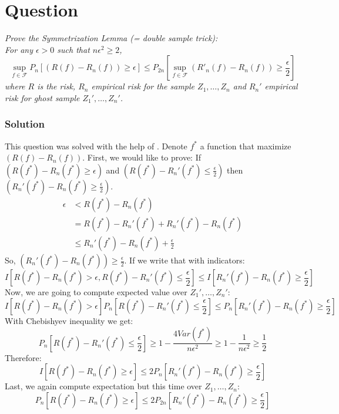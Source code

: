 \documentclass{article}
\newcounter{counterquestion}
\newenvironment{question}[1]
{
\stepcounter{counterquestion}
\section*{Question \thecounterquestion}
\emph{#1} 
} 
{
}
\newenvironment{solution}
{
\subsubsection*{Solution}
} 
{
}
\begin{document}
\begin{question}{Prove the Symmetrization Lemma (= double sample trick): \\
For any $\epsilon > 0$ such that $n\epsilon^2 \geq 2$, 
\[
\sup_{f \in \mathcal{F}} P_n \left[  (R(f) - R_n(f)) \geq \epsilon \right] \leq P_{2n} \left[ \sup_{f \in \mathcal{F}} (R'_n(f) - R_n(f)) \geq \frac{\epsilon}{2} \right]
\]
where $R$ is the risk, $R_n$ empirical risk for the sample $Z_1, \dots, Z_n$ and $R_n'$ empirical risk for ghost sample $Z_1', \dots, Z_n'$.}
\begin{solution}
This question was solved with the help of \cite{question3}.
Denote $f^*$ a function that maximize $(R(f) - R_n(f))$. First, we would like to prove: If $(R(f^*) - R_n(f^*) \geq \epsilon)$ and $(R(f^*) - R_n'(f^*) \leq \frac{\epsilon}{2})$ then $(R_n'(f^*) - R_n(f^*) \geq \frac{\epsilon}{2})$.
\begin{align*}
\epsilon & < R(f^*) - R_n(f^*) \\
& = R(f^*) - R_n'(f^*) + R_n'(f^*) - R_n(f^*) \\
& \leq R_n'(f^*) - R_n(f^*) + \frac{\epsilon}{2}
\end{align*}
So, $(R_n'(f^*) - R_n(f^*)) \geq \frac{\epsilon}{2}$. If we write that with indicators:
\[
I \left[ R(f^*) - R_n(f^*) > \epsilon, R(f^*) - R_n'(f^*) \leq \frac{\epsilon}{2} \right] \leq I \left[ R_n'(f^*) - R_n(f^*) \geq \frac{\epsilon}{2} \right]
\]
Now, we are going to compute expected value over $Z_1', \dots, Z_n'$:
\[
I \left[ R(f^*) - R_n(f^*) > \epsilon \right] P_n \left[ R(f^*) - R_n'(f^*) \leq \frac{\epsilon}{2} \right] \leq P_n \left[ R_n'(f^*) - R_n(f^*) \geq \frac{\epsilon}{2} \right]
\]
With Chebishyev inequality we get:
\[
P_n \left[ R(f^*) - R_n'(f^*) \leq \frac{\epsilon}{2} \right] \geq 1- \frac{4 Var(f^*)}{n\epsilon^2} \geq 1 - \frac{1}{n\epsilon^2} \geq \frac{1}{2}
\]
Therefore:
\[
I \left[ R(f^*) - R_n(f^*) \geq \epsilon \right]  \leq 2 P_n \left[ R_n'(f^*) - R_n(f^*) \geq \frac{\epsilon}{2} \right]
\]
Last, we again compute expectation but this time over $Z_1, \dots, Z_n$:
\[
P_n \left[ R(f^*) - R_n(f^*) \geq \epsilon \right]  \leq 2 P_{2n} \left[ R_n'(f^*) - R_n(f^*) \geq \frac{\epsilon}{2} \right]
\]
\end{solution}
\end{question}




\end{document}
